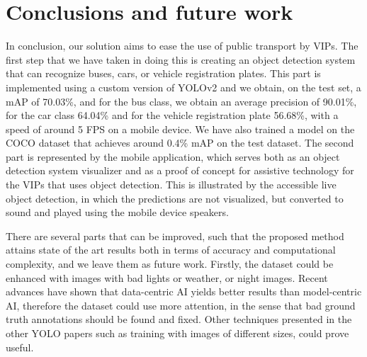 \section{Conclusions and future work}
    In conclusion, our solution aims to ease the use of public transport by VIPs. The first step that we have taken in doing this is creating an object detection system that can recognize buses, cars, or vehicle registration plates. This part is implemented using a custom version of YOLOv2 \cite{yolov2} and we obtain, on the test set, a mAP of 70.03\%, and for the bus class, we obtain an average precision of 90.01\%, for the car class 64.04\% and for the vehicle registration plate 56.68\%, with a speed of around 5 FPS on a mobile device. We have also trained a model on the COCO dataset that achieves around 0.4\% mAP on the test dataset. The second part is represented by the mobile application, which serves both as an object detection system visualizer and as a proof of concept for assistive technology for the VIPs that uses object detection. This is illustrated by the accessible live object detection, in which the predictions are not visualized, but converted to sound and played using the mobile device speakers. 
    
    
    There are several parts that can be improved, such that the proposed method attains state of the art results both in terms of accuracy and computational complexity, and we leave them as future work. Firstly, the dataset could be enhanced with images with bad lights or weather, or night images. Recent advances have shown that data-centric AI yields better results than model-centric AI, therefore the dataset could use more attention, in the sense that bad ground truth annotations should be found and fixed. Other techniques presented in the other YOLO papers such as training with images of different sizes, could prove useful. 
    

